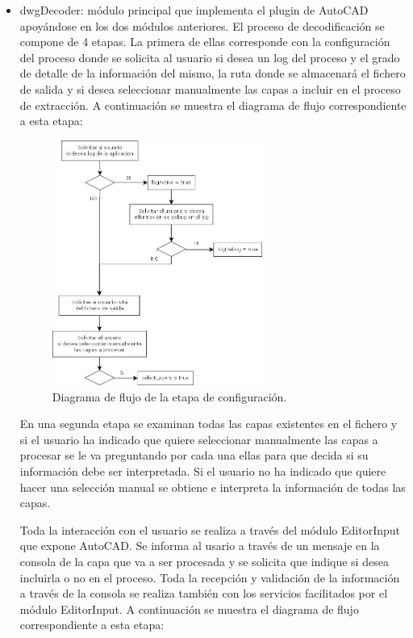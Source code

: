 \begin{itemize}
\begin{itemize}
\end{itemize}

\item{dwgDecoder: módulo principal que implementa el plugin de AutoCAD apoyándose en los dos módulos anteriores.
El proceso de decodificación se compone de 4 etapas. La primera de ellas corresponde con la configuración del proceso donde se solicita al usuario si desea un log del proceso y el grado de detalle de la información del mismo, la ruta donde se almacenará el fichero de salida y si desea seleccionar manualmente las capas a incluir en el proceso de extracción. A continuación se muestra el diagrama de flujo correspondiente a esta etapa:

\begin{figure}[H]
\begin{center}
\includegraphics[width=0.65\textwidth]{imgs/diagramaFlujo}
\caption{Diagrama de flujo de la etapa de configuración.}
\end{center}
\end{figure}

En una segunda etapa se examinan todas las capas existentes en el fichero y si el usuario ha indicado que quiere seleccionar manualmente las capas a procesar se le va preguntando por cada una ellas para que decida si su información debe ser interpretada. Si el usuario no ha indicado que quiere hacer una selección manual se obtiene e interpreta la información de todas las capas. 

Toda la interacción con el usuario se realiza a través del módulo EditorInput que expone AutoCAD. Se informa al usario a través de un mensaje en la consola de la capa que va a ser procesada y se solicita que indique si desea incluirla o no en el proceso. Toda la recepción y validación de la información a través de la consola se realiza también con los servicios facilitados por el módulo EditorInput. A continuación se muestra el diagrama de flujo correspondiente a esta etapa:

}
\end{itemize}
